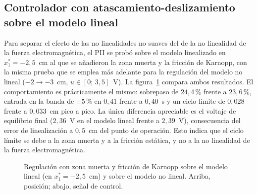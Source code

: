\subsection{Controlador con atascamiento-deslizamiento sobre el modelo lineal}

Para separar el efecto de las no linealidades no suaves del de la no linealidad de la fuerza electromagnética, el PII se probó sobre el modelo linealizado en $x_1^*=-2{,}5$~cm al que se añadieron la zona muerta y la fricción de Karnopp, con la misma prueba que se emplea más adelante para la regulación del modelo no lineal ($-2\to-3$~cm, $u\in[0;\,3{,}5]$~V). La figura~\ref{fig:p8_lineal_ad} compara ambos resultados. El comportamiento es prácticamente el mismo: sobrepaso de $24{,}4$\,\% frente a $23{,}6$\,\%, entrada en la banda de $\pm5$\,\% en $0{,}41$ frente a $0{,}40$~s y un ciclo límite de $0{,}028$ frente a $0{,}033$~cm pico a pico. La única diferencia apreciable es el voltaje de equilibrio final ($2{,}36$~V en el modelo lineal frente a $2{,}39$~V), consecuencia del error de linealización a $0{,}5$~cm del punto de operación. Esto indica que el ciclo límite se debe a la zona muerta y a la fricción estática, y no a la no linealidad de la fuerza electromagnética.

\begin{figure}[ht]
    \centering
    
    \caption[Modelo lineal con atascamiento-deslizamiento]{Regulación con zona muerta y fricción de Karnopp sobre el modelo lineal (en $x_1^*=-2{,}5$~cm) y sobre el modelo no lineal. Arriba, posición; abajo, señal de control.}
    \label{fig:p8_lineal_ad}
\end{figure}

\FloatBarrier
